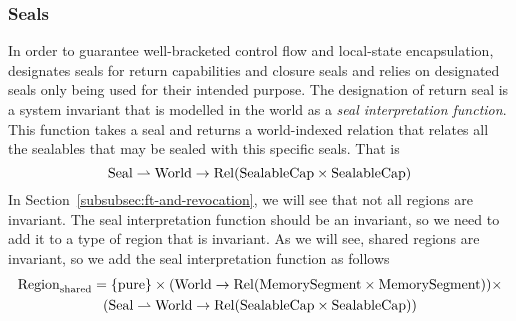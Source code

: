 \begin{jversion}
\subsubsection{Seals}
\label{subsubsec:seals}
In order to guarantee well-bracketed control flow and local-state encapsulation, \stktokens{} designates seals for return capabilities and closure seals and relies on designated seals only being used for their intended purpose.
The designation of return seal is a system invariant that is modelled in the world as a \textit{seal interpretation function}.
This function takes a seal and returns a world-indexed relation that relates all the sealables that may be sealed with this specific seals.
That is
\[
  \mathrm{Seal} \rightharpoonup \mathrm{World} \rightarrow \mathrm{Rel}(\mathrm{SealableCap} \times \mathrm{SealableCap})
\]
In Section~\ref{subsubsec:ft-and-revocation}, we will see that not all regions are invariant.
The seal interpretation function should be an invariant, so we need to add it to a type of region that is invariant.
As we will see, shared regions are invariant, so we add the seal interpretation function as follows
\begin{multline*}
  \mathrm{Region}_\mathrm{shared} = 
  \{\mathrm{pure} \} \times (\mathrm{World} \rightarrow \mathrm{Rel}(\mathrm{MemorySegment}\times\mathrm{MemorySegment})) \times \\
  (\mathrm{Seal} \rightharpoonup \mathrm{World} \rightarrow \mathrm{Rel}(\mathrm{SealableCap} \times \mathrm{SealableCap}))
\end{multline*}



\end{jversion}
